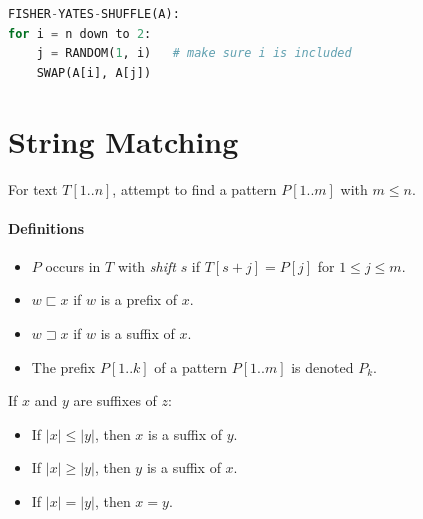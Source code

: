\documentclass[twocolumn,english]{article}
\numberwithin{equation}{section}
\numberwithin{figure}{section}
\numberwithin{table}{section}
\begin{document}
\begin{lstlisting}[language=Python,basicstyle={\footnotesize\ttfamily},tabsize=4,frame=single]
FISHER-YATES-SHUFFLE(A):
for i = n down to 2:
	j = RANDOM(1, i)   # make sure i is included
	SWAP(A[i], A[j])
\end{lstlisting}

\section{String Matching}

For text $T\left[1..n\right]$, attempt to find a pattern $P\left[1..m\right]$
with $m\leq n$.

\paragraph{Definitions}
\begin{itemize}
\item $P$ occurs in $T$ with \emph{shift} $s$ if $T\left[s+j\right]=P\left[j\right]$
for $1\leq j\leq m$.
\item $w\sqsubset x$ if $w$ is a prefix of $x$.
\item $w\sqsupset x$ if $w$ is a suffix of $x$.
\item The prefix $P\left[1..k\right]$ of a pattern $P\left[1..m\right]$
is denoted $P_{k}$.
\end{itemize}
If $x$ and $y$ are suffixes of $z$:
\begin{itemize}
\item If $\left|x\right|\leq\left|y\right|$, then $x$ is a suffix of $y$.
\item If $\left|x\right|\geq\left|y\right|$, then $y$ is a suffix of $x$.
\item If $\left|x\right|=\left|y\right|$, then $x=y$.
\end{itemize}
\end{document}
